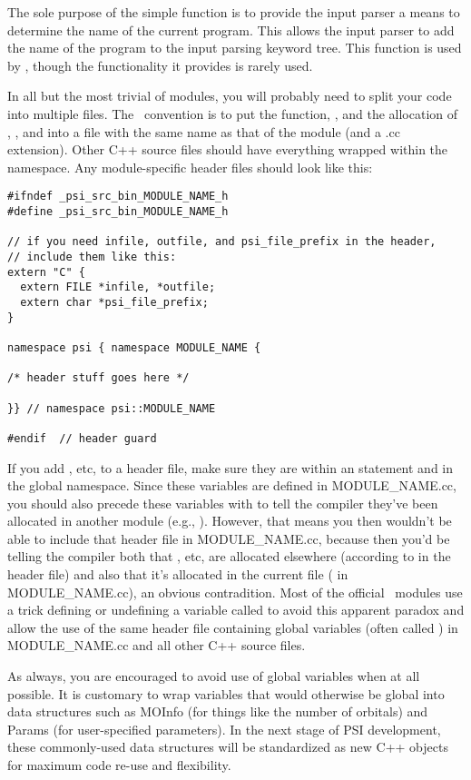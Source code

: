 The sole purpose of the simple function  is to provide
the input parser a means to determine the name of the current program.
This allows the input parser to add the name of the program to the
input parsing keyword tree.  This function is used by
, though the functionality it provides is rarely
used.

In all but the most trivial of modules, you will probably need to split
your code into multiple files.  The \PSIthree\ convention is to put
the  function, , and the allocation of
, , and  into a
file with the same name as that of the module (and a .cc extension).
Other C++ source files should have everything wrapped within the
 namespace.  Any module-specific header files
should look like this:

\begin{verbatim}
#ifndef _psi_src_bin_MODULE_NAME_h
#define _psi_src_bin_MODULE_NAME_h

// if you need infile, outfile, and psi_file_prefix in the header,
// include them like this:
extern "C" {
  extern FILE *infile, *outfile;
  extern char *psi_file_prefix;
}

namespace psi { namespace MODULE_NAME {

/* header stuff goes here */

}} // namespace psi::MODULE_NAME

#endif  // header guard 
\end{verbatim} 

If you add , etc, to a header file, make sure they are
within an  statement and in the global namespace.
Since these variables are defined in MODULE\_NAME.cc, you should also
precede these variables with  to tell the compiler they've
been allocated in another module (e.g., ).
However, that means you then wouldn't be able to include that header
file in MODULE\_NAME.cc, because then you'd be telling the compiler
both that , etc, are allocated elsewhere (according
to  in the header file) and also that it's
allocated in the current file ( in MODULE\_NAME.cc),
an obvious contradition.  Most of the official \PSIthree\ modules
use a trick defining or undefining a variable called 
to avoid this apparent paradox and allow the use of the same header
file containing global variables (often called ) in
MODULE\_NAME.cc and all other C++ source files.

As always, you are encouraged to avoid use of global variables when at
all possible.  It is customary to wrap variables that would otherwise be
global into data structures such as MOInfo (for things like the number
of orbitals) and Params (for user-specified parameters).  In the next
stage of PSI development, these commonly-used data structures will be
standardized as new C++ objects for maximum code re-use and flexibility.

